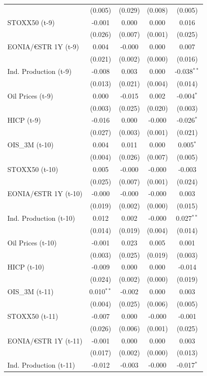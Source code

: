 \begin{longtable}[t]{lcccc}
 & (0.005) & (0.029) & (0.008) & (0.005)\\
STOXX50 (t-9) & -0.001 & 0.000 & 0.000 & 0.016\\
 & (0.026) & (0.007) & (0.001) & (0.025)\\
EONIA/€STR 1Y (t-9) & 0.004 & -0.000 & 0.000 & 0.007\\
 & (0.021) & (0.002) & (0.000) & (0.016)\\
Ind. Production (t-9) & -0.008 & 0.003 & 0.000 & -0.038$^{**}$\\
 & (0.013) & (0.021) & (0.004) & (0.014)\\
Oil Prices (t-9) & 0.000 & -0.015 & 0.002 & -0.004$^{*}$\\
 & (0.003) & (0.025) & (0.020) & (0.003)\\
HICP (t-9) & -0.016 & 0.000 & -0.000 & -0.026$^{*}$\\
 & (0.027) & (0.003) & (0.001) & (0.021)\\
OIS\_3M (t-10) & 0.004 & 0.011 & 0.000 & 0.005$^{*}$\\
 & (0.004) & (0.026) & (0.007) & (0.005)\\
STOXX50 (t-10) & 0.005 & -0.000 & -0.000 & -0.003\\
 & (0.025) & (0.007) & (0.001) & (0.024)\\
EONIA/€STR 1Y (t-10) & -0.000 & -0.000 & -0.000 & 0.003\\
 & (0.019) & (0.002) & (0.000) & (0.015)\\
Ind. Production (t-10) & 0.012 & 0.002 & -0.000 & 0.027$^{**}$\\
 & (0.014) & (0.019) & (0.004) & (0.014)\\
Oil Prices (t-10) & -0.001 & 0.023 & 0.005 & 0.001\\
 & (0.003) & (0.025) & (0.019) & (0.003)\\
HICP (t-10) & -0.009 & 0.000 & 0.000 & -0.014\\
 & (0.024) & (0.002) & (0.000) & (0.019)\\
OIS\_3M (t-11) & 0.010$^{**}$ & -0.002 & 0.000 & 0.003\\
 & (0.004) & (0.025) & (0.006) & \vphantom{1} (0.005)\\
STOXX50 (t-11) & -0.007 & 0.000 & -0.000 & -0.001\\
 & (0.026) & (0.006) & (0.001) & (0.025)\\
EONIA/€STR 1Y (t-11) & -0.001 & 0.000 & 0.000 & 0.003\\
 & (0.017) & (0.002) & (0.000) & (0.013)\\
Ind. Production (t-11) & -0.012 & -0.003 & -0.000 & -0.017$^{*}$\\

\end{longtable}
